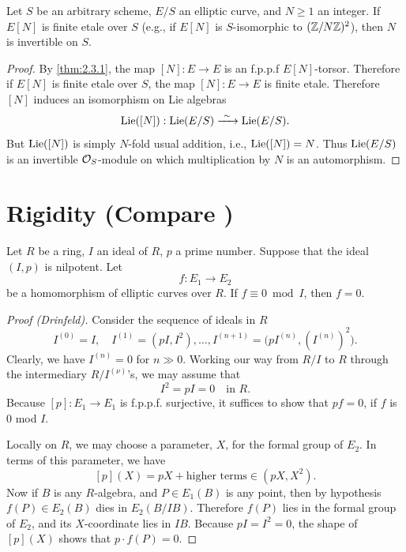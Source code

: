 \begin{corollary}\label{cor:2.3.2}
Let $S$ be an arbitrary scheme, $E/S$ an elliptic curve, and $N \ge 1$ an integer. If $E[N]$ is finite etale over $S$ (e.g., if $E[N]$ is $S$-isomorphic to $(\mathbb{Z}/N\mathbb{Z})^2$), then $N$ is invertible on $S$.
\end{corollary}

\begin{proof}
By \ref{thm:2.3.1}, the map $[N] : E \to E$ is an f.p.p.f $E[N]$-torsor. Therefore if $E[N]$ is finite etale over $S$, the map $[N] : E \to E$ is finite etale. Therefore $[N]$ induces an isomorphism on Lie algebras
\[
\operatorname{Lie}([N]) : \operatorname{Lie}(E/S) \xrightarrow{\ \sim\ } \operatorname{Lie}(E/S).
\]
But $\operatorname{Lie}([N])$ is simply $N$-fold usual addition, i.e., $\operatorname{Lie}([N]) = N$. Thus $\operatorname{Lie}(E/S)$ is an invertible $\mathcal{O}_S$-module on which multiplication by $N$ is an automorphism.
\end{proof}

\section{Rigidity (Compare \cite{Mum3})}
\label{sec:2.4}

\begin{theorem}\label{thm:2.4.1}
Let $R$ be a ring, $I$ an ideal of $R$, $p$ a prime number. Suppose that the ideal $(I, p)$ is nilpotent. Let
\[
f : E_1 \longrightarrow E_2
\]
be a homomorphism of elliptic curves over $R$. If $f \equiv 0 \bmod I$, then $f = 0$.
\end{theorem}


\begin{proof}[Proof (Drinfeld)]
Consider the sequence of ideals in $R$
\[
I^{(0)} = I, \quad I^{(1)} = (pI, I^2), \ldots, I^{(n+1)} = \bigl(pI^{(n)}, (I^{(n)})^2\bigr).
\]
Clearly, we have $I^{(n)} = 0$ for $n \gg 0$. Working our way from $R/I$ to $R$ through the intermediary $R/I^{(\nu)}$'s, we may assume that
\[
I^2 = pI = 0 \quad \text{in } R.
\]
Because $[p] : E_1 \to E_1$ is f.p.p.f. surjective, it suffices to show that $pf = 0$, if $f$ is $0$ mod $I$.

Locally on $R$, we may choose a parameter, $X$, for the formal group of $E_2$. In terms of this parameter, we have
\[
[p](X) = pX + \text{higher terms} \in (pX, X^2).
\]
Now if $B$ is any $R$-algebra, and $P \in E_1(B)$ is any point, then by hypothesis $f(P) \in E_2(B)$ dies in $E_2(B/IB)$. Therefore $f(P)$ lies in the formal group of $E_2$, and its $X$-coordinate lies in $IB$. Because $pI = I^2 = 0$, the shape of $[p](X)$ shows that $p \cdot f(P) = 0$.
\end{proof}

